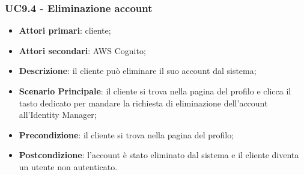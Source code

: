 \subsubsection{UC9.4 - Eliminazione account}
\begin{itemize}
\item \textbf{Attori primari}: cliente;
\item \textbf{Attori secondari}: AWS Cognito;
\item \textbf{Descrizione}: il cliente può eliminare il suo account dal sistema;
\item \textbf{Scenario Principale}: il cliente si trova nella pagina del profilo e clicca il tasto dedicato per mandare la richiesta di eliminazione dell'account all'Identity Manager;
\item \textbf{Precondizione}: il cliente si trova nella pagina del profilo;
\item \textbf{Postcondizione}: l'account è stato eliminato dal sistema e il cliente diventa un utente non autenticato.
\end{itemize}

